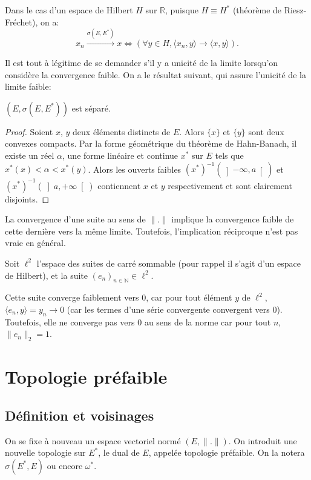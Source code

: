 Dans le cas d'un espace de Hilbert $H$ sur $\mathbb R$, puisque $H\equiv H^*$
(théorème de Riesz-Fréchet), on a:
$$x_n\xrightarrow{\sigma(E, E^*)}x \iff
\left(\forall y\in H, \langle x_n, y\rangle \to \langle x, y\rangle\right).$$

Il est tout à légitime de se demander s'il y a unicité de la limite
lorsqu'on considère la convergence faible. On a le résultat suivant, qui
assure l'unicité de la limite faible:
\begin{prop}
  $(E, \sigma(E, E^*))$ est séparé.
\end{prop}

\begin{proof}
  Soient $x$, $y$ deux éléments distincts de $E$. Alors $\{x\}$ et
  $\{y\}$ sont deux convexes compacts.
  Par la forme géométrique du théorème de Hahn-Banach, il existe
  un réel $\alpha$, une forme linéaire et continue $x^*$ sur $E$
  tels que $x^*(x) < \alpha < x^*(y)$.
  Alors les ouverts faibles $(x^*)^{-1}(\left]-\infty, a\right[)$
  et $(x^*)^{-1}(\left]a, +\infty\right[)$ contiennent $x$
  et $y$ respectivement et sont clairement disjoints.
\end{proof}

\begin{rem}
  La convergence d'une suite au sens de $\|.\|$ implique la convergence faible
  de cette dernière vers la même limite. Toutefois, l'implication réciproque
  n'est pas vraie en général.

  Soit $\ell^2$ l'espace des suites de carré sommable
  (pour rappel il s'agit d'un espace
  de Hilbert), et la suite $(e_n)_{n\in\mathbb N}\in \ell^2$.

  Cette suite converge faiblement vers $0$, car pour tout élément
  $y$ de $\ell^2$, $\langle e_n, y\rangle = y_n \to 0$ (car
  les termes d'une série convergente convergent vers $0$).
  Toutefois, elle ne converge pas vers $0$ au sens de la norme
  car pour tout $n$, $\|e_n\|_2 = 1$.
\end{rem}

\section{Topologie préfaible}
\subsection{Définition et voisinages}
On se fixe à nouveau un espace vectoriel normé $(E, \|.\|)$. On introduit
une nouvelle topologie sur $E^*$, le dual de $E$, appelée topologie
préfaible. On la notera $\sigma(E^*, E)$ ou encore $\omega^*$.


